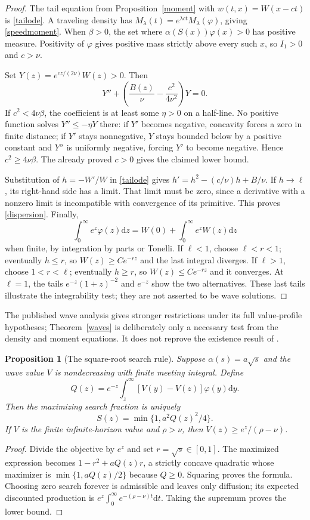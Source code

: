 \documentclass[11pt]{article}
\newtheorem{proposition}[theorem]{Proposition}
\newcommand{\dd}{\mathrm d}
\begin{document}
\begin{proof}
The tail equation from Proposition~\ref{moment} with $w(t,x)=W(x-ct)$ is \eqref{tailode}. A traveling density has $M_\lambda(t)=e^{\lambda ct}M_\lambda(\varphi)$, giving \eqref{speedmoment}. When $\beta>0$, the set where $\alpha(S(x))\varphi(x)>0$ has positive measure. Positivity of $\varphi$ gives positive mass strictly above every such $x$, so $I_1>0$ and $c>\nu$.

Set $Y(z)=e^{cz/(2\nu)}W(z)>0$. Then
\[
 Y''+\left(\frac{B(z)}\nu-\frac{c^2}{4\nu^2}\right)Y=0.
\]
If $c^2<4\nu\beta$, the coefficient is at least some $\eta>0$ on a half-line. No positive function solves $Y''\le-\eta Y$ there: if $Y'$ becomes negative, concavity forces a zero in finite distance; if $Y'$ stays nonnegative, $Y$ stays bounded below by a positive constant and $Y''$ is uniformly negative, forcing $Y'$ to become negative. Hence $c^2\ge4\nu\beta$. The already proved $c>0$ gives the claimed lower bound.

Substitution of $h=-W'/W$ in \eqref{tailode} gives
$h'=h^2-(c/\nu)h+B/\nu$. If $h\to\ell$, its right-hand side has a limit. That limit must be zero, since a derivative with a nonzero limit is incompatible with convergence of its primitive. This proves \eqref{dispersion}. Finally,
\[
 \int_0^\infty e^z\varphi(z)\dd z=W(0)+\int_0^\infty e^zW(z)\dd z
\]
when finite, by integration by parts or Tonelli. If $\ell<1$, choose $\ell<r<1$; eventually $h\le r$, so $W(z)\ge C e^{-rz}$ and the last integral diverges. If $\ell>1$, choose $1<r<\ell$; eventually $h\ge r$, so $W(z)\le C e^{-rz}$ and it converges. At $\ell=1$, the tails $e^{-z}(1+z)^{-2}$ and $e^{-z}$ show the two alternatives. These last tails illustrate the integrability test; they are not asserted to be wave solutions.
\end{proof}

The published wave analysis gives stronger restrictions under its full value-profile hypotheses; Theorem~\ref{waves} is deliberately only a necessary test from the density and moment equations. It does not reprove the existence result of \cite{PR}.

\begin{proposition}[The square-root search rule]
Suppose $\alpha(s)=a\sqrt{s}$ and the wave value $V$ is nondecreasing with finite meeting integral. Define
\[
 Q(z)=e^{-z}\int_z^\infty[V(y)-V(z)]\varphi(y)\dd y.
\]
Then the maximizing search fraction is uniquely
\[
 S(z)=\min\{1,a^2Q(z)^2/4\}.
\]
If $V$ is the finite infinite-horizon value and $\rho>\nu$, then
$V(z)\ge e^z/(\rho-\nu)$.
\end{proposition}
\begin{proof}
Divide the objective by $e^z$ and set $r=\sqrt{s}\in[0,1]$. The maximized expression becomes $1-r^2+aQ(z)r$, a strictly concave quadratic whose maximizer is $\min\{1,aQ(z)/2\}$ because $Q\ge0$. Squaring proves the formula. Choosing zero search forever is admissible and leaves only diffusion; its expected discounted production is $e^z\int_0^\infty e^{-(\rho-\nu)t}\dd t$. Taking the supremum proves the lower bound.
\end{proof}
\end{document}
